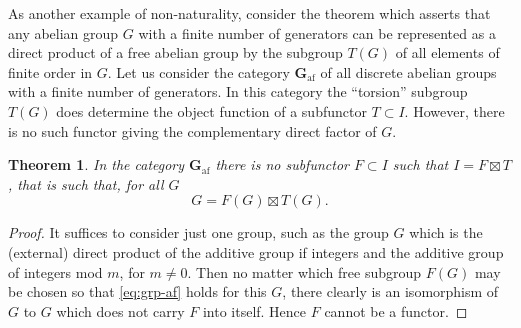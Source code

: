 \documentclass[11pt,a4paper]{report}
\newtheorem{theorem}{Theorem}
\begin{document}
As another example of non\hyp{}naturality, consider the theorem which asserts that any abelian group $G$ with a finite
number of generators can be represented as a direct product of a free abelian group by the subgroup $T(G)$ of all 
elements of finite order in $G$. Let us consider the category $\mathbf{G}_\text{af}$ of all discrete abelian groups
with a finite number of generators. In this category the ``torsion'' subgroup $T(G)$ does determine the object function
of a subfunctor $T\subset I$. However, there is no such functor giving the complementary direct factor of $G$.
\begin{theorem}
	In the category $\mathbf{G}_\textrm{af}$ there is no subfunctor $F\subset I$ such that $I=F\boxtimes T$, that is 
	such that, for all $G$
	\begin{equation}\label{eq:grp-af}
		G=F(G)\boxtimes T(G).
	\end{equation}
\end{theorem}
\begin{proof}
	It suffices to consider just one group, such as the group $G$ which is the (external) direct product of the additive
	group if integers and the additive group of integers mod $m$, for $m\neq 0$. Then no matter which free subgroup 
	$F(G)$ may be chosen so that \cref{eq:grp-af} holds for this $G$, there clearly is an isomorphism of $G$ to $G$
	which does not carry $F$ into itself. Hence $F$ cannot be a functor.
\end{proof}
\end{document}
